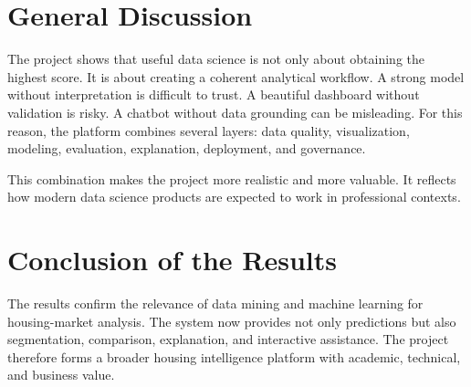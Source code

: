 \section{General Discussion}

The project shows that useful data science is not only about obtaining the highest score. It is about creating a coherent analytical workflow. A strong model without interpretation is difficult to trust. A beautiful dashboard without validation is risky. A chatbot without data grounding can be misleading. For this reason, the platform combines several layers: data quality, visualization, modeling, evaluation, explanation, deployment, and governance.

This combination makes the project more realistic and more valuable. It reflects how modern data science products are expected to work in professional contexts.

\section{Conclusion of the Results}

The results confirm the relevance of data mining and machine learning for housing-market analysis. The system now provides not only predictions but also segmentation, comparison, explanation, and interactive assistance. The project therefore forms a broader housing intelligence platform with academic, technical, and business value.
